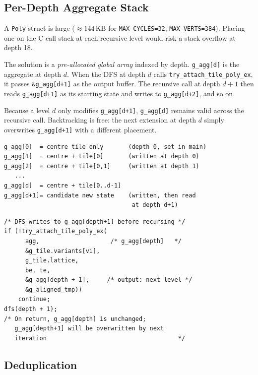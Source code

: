 \documentclass[10pt,a4paper]{article}
\let\polysubsection\subsection
\renewcommand\subsection{\needspace{0.12\textheight}\polysubsection}
\newcommand{\code}[1]{\texttt{\small #1}}
\begin{document}
\subsection{Per-Depth Aggregate Stack}

\begin{tcolorbox}[dualbox, title={Stack Layout — \code{g\_agg[0..MAX\_SUR+1]}}]
  A \code{Poly} struct is large
  ($\approx 144\,\text{KB}$ for \code{MAX\_CYCLES=32}, \code{MAX\_VERTS=384}).
  Placing one on the C call stack at each recursive level would risk a
  stack overflow at depth 18.

  The solution is a \emph{pre-allocated global array} indexed by depth.
  \code{g\_agg[d]} is the aggregate at depth $d$.  When the DFS at
  depth $d$ calls \code{try\_attach\_tile\_poly\_ex}, it passes
  \code{\&g\_agg[d+1]} as the output buffer.  The recursive call at
  depth $d{+}1$ then reads \code{g\_agg[d+1]} as its starting state
  and writes to \code{g\_agg[d+2]}, and so on.

  Because a level $d$ only modifies \code{g\_agg[d+1]}, \code{g\_agg[d]}
  remains valid across the recursive call.  Backtracking is free:
  the next extension at depth $d$ simply overwrites \code{g\_agg[d+1]}
  with a different placement.
\tcblower
\begin{verbatim}
g_agg[0]  = centre tile only       (depth 0, set in main)
g_agg[1]  = centre + tile[0]       (written at depth 0)
g_agg[2]  = centre + tile[0,1]     (written at depth 1)
   ...
g_agg[d]  = centre + tile[0..d-1]
g_agg[d+1]= candidate new state    (written, then read
                                    at depth d+1)
\end{verbatim}
\vspace{6pt}

\begin{verbatim}
/* DFS writes to g_agg[depth+1] before recursing */
if (!try_attach_tile_poly_ex(
      agg,                    /* g_agg[depth]   */
      &g_tile.variants[vi],
      g_tile.lattice,
      be, te,
      &g_agg[depth + 1],     /* output: next level */
      &g_aligned_tmp))
    continue;
dfs(depth + 1);
/* On return, g_agg[depth] is unchanged;
   g_agg[depth+1] will be overwritten by next
   iteration                                     */
\end{verbatim}
\end{tcolorbox}

\subsection{Deduplication}
\end{document}
